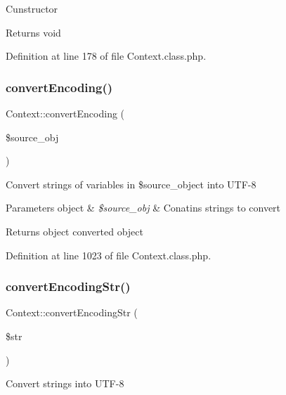 Cunstructor

\begin{DoxyReturn}{Returns}
void 
\end{DoxyReturn}


Definition at line 178 of file Context.\+class.\+php.

\hypertarget{classContext_a9ef4f41a9ae7108ea7560162399c77a8}{}\label{classContext_a9ef4f41a9ae7108ea7560162399c77a8} 
\subsubsection{\texorpdfstring{convert\+Encoding()}{convertEncoding()}}
{\footnotesize\ttfamily Context\+::convert\+Encoding (\begin{DoxyParamCaption}\item[{}]{\$source\+\_\+obj }\end{DoxyParamCaption})}

Convert strings of variables in \$source\+\_\+object into U\+T\+F-\/8


\begin{DoxyParams}[1]{Parameters}
object & {\em \$source\+\_\+obj} & Conatins strings to convert \\
\hline
\end{DoxyParams}
\begin{DoxyReturn}{Returns}
object converted object 
\end{DoxyReturn}


Definition at line 1023 of file Context.\+class.\+php.

\hypertarget{classContext_a0464dcbadfd67f62265fac90546d3bf8}{}\label{classContext_a0464dcbadfd67f62265fac90546d3bf8} 
\subsubsection{\texorpdfstring{convert\+Encoding\+Str()}{convertEncodingStr()}}
{\footnotesize\ttfamily Context\+::convert\+Encoding\+Str (\begin{DoxyParamCaption}\item[{}]{\$str }\end{DoxyParamCaption})}

Convert strings into U\+T\+F-\/8


